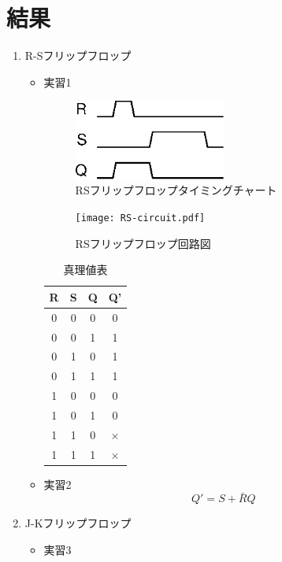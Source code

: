 \documentclass[dvipdfmx, a4paper]{jsarticle}
\begin{document}
	\section{結果}
		\begin{enumerate}
			\item R-Sフリップフロップ
				\begin{itemize}
					\item 実習1
						\begin{figure}
							\center
							\includegraphics[width=5cm]{rs.eps}
							\caption{RSフリップフロップタイミングチャート}
						\end{figure}
						\begin{figure}
							\center
							\texttt{[image: RS-circuit.pdf]}
							\caption{RSフリップフロップ回路図}
						\end{figure}
						\begin{table}[H]
							\center
							\caption{真理値表}
							\begin{tabular}{|c|c|c|c|}
								\hline
								R & S & Q & Q' \\ \hline
								0 & 0 & 0 & 0 \\ \hline
								0 & 0 & 1 & 1 \\ \hline
								0 & 1 & 0 & 1 \\ \hline
								0 & 1 & 1 & 1 \\ \hline
								1 & 0 & 0 & 0 \\ \hline
								1 & 0 & 1 & 0 \\ \hline
								1 & 1 & 0 & $\times$ \\ \hline
								1 & 1 & 1 & $\times$ \\ \hline
							\end{tabular}
						\end{table}
					\item 実習2
						\begin{equation}
							Q' = S + \bar{R} Q
						\end{equation}
				\end{itemize}
			\item J-Kフリップフロップ
				\begin{itemize}
					\item 実習3

\end{itemize}
\end{enumerate}
\end{document}
